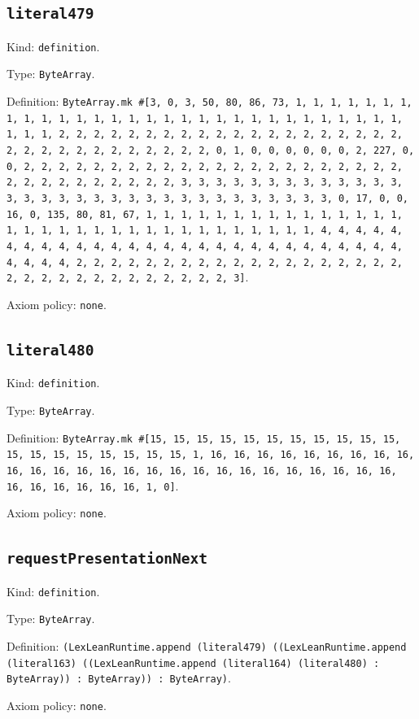 \documentclass[11pt]{article}
\begin{document}
\subsection*{\texttt{literal479}}
\noindent Kind: \texttt{definition}.\par
\noindent Type: \texttt{ByteArray}.\par
\noindent Definition: \texttt{ByteArray.mk \#[3, 0, 3, 50, 80, 86, 73, 1, 1, 1, 1, 1, 1, 1, 1, 1, 1, 1, 1, 1, 1, 1, 1, 1, 1, 1, 1, 1, 1, 1, 1, 1, 1, 1, 1, 1, 1, 1, 1, 1, 2, 2, 2, 2, 2, 2, 2, 2, 2, 2, 2, 2, 2, 2, 2, 2, 2, 2, 2, 2, 2, 2, 2, 2, 2, 2, 2, 2, 2, 2, 2, 2, 0, 1, 0, 0, 0, 0, 0, 0, 2, 227, 0, 0, 2, 2, 2, 2, 2, 2, 2, 2, 2, 2, 2, 2, 2, 2, 2, 2, 2, 2, 2, 2, 2, 2, 2, 2, 2, 2, 2, 2, 2, 2, 2, 2, 3, 3, 3, 3, 3, 3, 3, 3, 3, 3, 3, 3, 3, 3, 3, 3, 3, 3, 3, 3, 3, 3, 3, 3, 3, 3, 3, 3, 3, 3, 3, 3, 0, 17, 0, 0, 16, 0, 135, 80, 81, 67, 1, 1, 1, 1, 1, 1, 1, 1, 1, 1, 1, 1, 1, 1, 1, 1, 1, 1, 1, 1, 1, 1, 1, 1, 1, 1, 1, 1, 1, 1, 1, 1, 1, 4, 4, 4, 4, 4, 4, 4, 4, 4, 4, 4, 4, 4, 4, 4, 4, 4, 4, 4, 4, 4, 4, 4, 4, 4, 4, 4, 4, 4, 4, 4, 4, 2, 2, 2, 2, 2, 2, 2, 2, 2, 2, 2, 2, 2, 2, 2, 2, 2, 2, 2, 2, 2, 2, 2, 2, 2, 2, 2, 2, 2, 2, 2, 2, 3]}.\par
\noindent Axiom policy: \texttt{none}.\par
\subsection*{\texttt{literal480}}
\noindent Kind: \texttt{definition}.\par
\noindent Type: \texttt{ByteArray}.\par
\noindent Definition: \texttt{ByteArray.mk \#[15, 15, 15, 15, 15, 15, 15, 15, 15, 15, 15, 15, 15, 15, 15, 15, 15, 15, 15, 1, 16, 16, 16, 16, 16, 16, 16, 16, 16, 16, 16, 16, 16, 16, 16, 16, 16, 16, 16, 16, 16, 16, 16, 16, 16, 16, 16, 16, 16, 16, 16, 16, 1, 0]}.\par
\noindent Axiom policy: \texttt{none}.\par
\subsection*{\texttt{requestPresentationNext}}
\noindent Kind: \texttt{definition}.\par
\noindent Type: \texttt{ByteArray}.\par
\noindent Definition: \texttt{(LexLeanRuntime.append (literal479) ((LexLeanRuntime.append (literal163) ((LexLeanRuntime.append (literal164) (literal480) : ByteArray)) : ByteArray)) : ByteArray)}.\par
\noindent Axiom policy: \texttt{none}.\par
\end{document}
